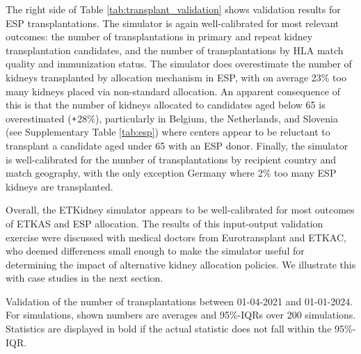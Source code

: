 \par
The right side of Table \ref{tab:transplant_validation} shows validation results for ESP transplantations. The simulator is again well-calibrated for most relevant outcomes: the number of transplantations in primary and repeat kidney transplantation candidates, and the number of transplantations by HLA match quality and immunization status. The simulator does overestimate the number of kidneys transplanted by allocation mechanism in ESP, with on average 23\% too many kidneys placed via non-standard allocation. An apparent consequence of this is that the number of kidneys allocated to candidates aged below 65 is overestimated ($\texttt{+}$28\%), particularly in Belgium, the Netherlands, and Slovenia (see Supplementary Table \ref{tab:esp}) where centers appear to be reluctant to transplant a candidate aged under 65 with an ESP donor. Finally, the simulator is well-calibrated for the number of transplantations by recipient country and match geography, with the only exception Germany where 2\% too many ESP kidneys are transplanted.
\par
Overall, the ETKidney simulator appears to be well-calibrated for most outcomes of ETKAS and ESP allocation. The results of this input-output validation exercise were discussed with medical doctors from Eurotransplant and ETKAC, who deemed differences small enough to make the simulator useful for determining the impact of alternative kidney allocation policies. We illustrate this with case studies in the next section. 
\begin{table}[h]
	\caption{Validation of the number of transplantations between 01-04-2021 and 01-01-2024. For simulations, shown numbers are averages and 95\%-IQRs over 200 simulations. 
		Statistics are displayed in bold if the actual statistic does not fall within the 95\%-IQR.}
	
	\label{tab:transplant_validation}
\end{table}
\FloatBarrier

